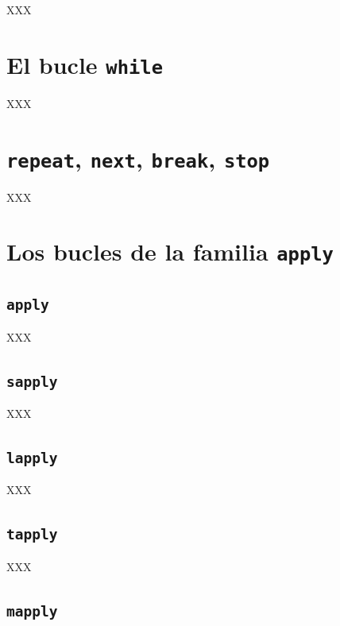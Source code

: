 \documentclass[]{book}
\begin{document}
XXX

\section{\texorpdfstring{El bucle
\texttt{while}}{El bucle while}}\label{el-bucle-while}

XXX

\section{\texorpdfstring{\texttt{repeat}, \texttt{next}, \texttt{break},
\texttt{stop}}{repeat, next, break, stop}}\label{repeat-next-break-stop}

XXX

\section{\texorpdfstring{Los bucles de la familia
\texttt{apply}}{Los bucles de la familia apply}}\label{los-bucles-de-la-familia-apply}

\subsection{\texorpdfstring{\texttt{apply}}{apply}}\label{apply}

XXX

\subsection{\texorpdfstring{\texttt{sapply}}{sapply}}\label{sapply}

XXX

\subsection{\texorpdfstring{\texttt{lapply}}{lapply}}\label{lapply}

XXX

\subsection{\texorpdfstring{\texttt{tapply}}{tapply}}\label{tapply}

XXX

\subsection{\texorpdfstring{\texttt{mapply}}{mapply}}\label{mapply}
\end{document}
